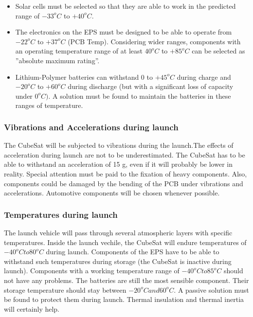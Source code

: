 \begin{itemize}
\item Solar cells must be selected so that they are able to work in the predicted range of $-33^{o}C$ to $+40^{o}C$.
\item The electronics on the EPS must be designed to be able to operate from $-22^{o}C$ to $+37^{o}C$ (PCB Temp). Considering wider ranges, components with an operating temperature range of at least  $40^{o}C$ to $+85^{o}C$ can be selected as ”absolute maximum rating”.
\item Lithium-Polymer batteries can withstand 0 to $+45^{o}C$ during charge and $-20^{o}C$ to $+60^{o}C$ during discharge (but with a significant loss of capacity under $0^{o}C)$. A solution must be found to maintain the batteries in these ranges of temperature.
\end{itemize}

\subsubsection{Vibrations and Accelerations during launch} 

The CubeSat will be subjected to vibrations during the launch.The effects of acceleration during launch are not to be underestimated. The CubeSat has to be able to withstand an acceleration of 15 g, even if it will probably be lower in reality. Special attention must be paid to the fixation of heavy components. Also, components could be damaged by the bending of the PCB under vibrations and accelerations. Automotive components will be chosen whenever possible.

\subsubsection{Temperatures during launch} 

The launch vehicle will pass through several atmospheric layers with specific temperatures. Inside the launch vechile, the CubeSat will endure temperatures of $-40^{o}C to 80^{o}C$ during launch. Components of the EPS have to be able to withstand such temperatures during storage (the CubeSat is inactive during launch). Components with a working temperature range of $-40^{o}C to 85^{o}C$ should not have any problems.
The batteries are still the most sensible component. Their storage temperature should stay between $-20^{o}C and 60^{o}C$. A passive solution must be found to protect them during launch. Thermal insulation and thermal inertia will certainly help.




